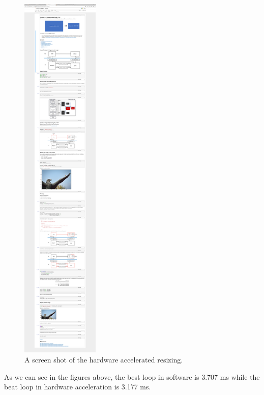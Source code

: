 \documentclass[a4paper]{article}
\begin{document}
\begin{figure}[H]
    \centering
    \includegraphics[width=0.33\textwidth]{4.png}
    \caption{A screen shot of the hardware accelerated resizing.}
\end{figure}
As we can see in the figures above, the best loop in software is 3.707 ms while the beat loop in hardware acceleration is 3.177 ms.
\end{document}
